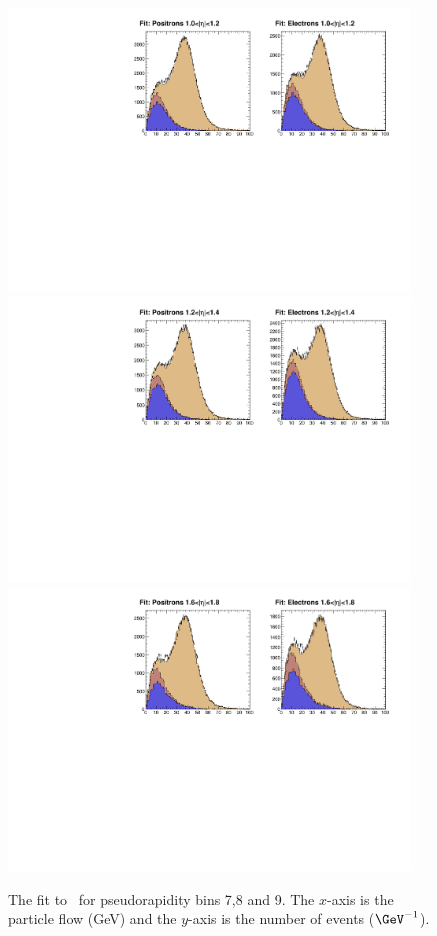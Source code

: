 \begin{figure}
\begin{center}
\includegraphics[width=0.95\textwidth]{data_5.pdf}
\includegraphics[width=0.95\textwidth]{data_6.pdf} \\
\includegraphics[width=0.95\textwidth]{data_7.pdf} \\
\caption[The fit to \MET for pseudorapidity bins 6,7 and 8.]
{\label{fig:data3} The fit to \MET\ for pseudorapidity bins 7,8 and
9.  The $x$-axis is the particle flow \ETm (GeV) and the $y$-axis is the number
of events ($\GeV^{-1}$).}
\end{center}
\end{figure}

